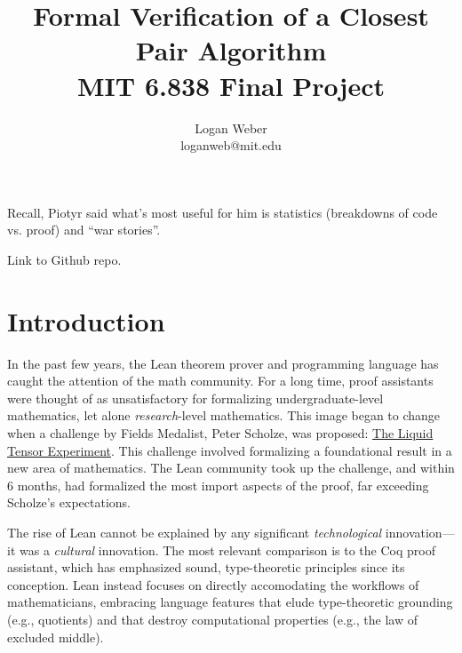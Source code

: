 \documentclass{article}
\begin{document}
\title{%
  Formal Verification of a Closest Pair Algorithm
  \\[0.5em]
  \large MIT 6.838 Final Project \\
}

\author{
Logan Weber\\
loganweb@mit.edu
}

\def\aSigma{\overline{\Sigma}}
\def\asigma{\overline{\sigma}}
\def\aheap{\overline{h}}

\date{}

\maketitle

\tableofcontents

Recall, Piotyr said what's most useful for him is statistics (breakdowns of code vs. proof) and ``war stories''.

Link to Github repo.

\section{Introduction}
In the past few years, the Lean theorem prover and programming language has caught the attention of the math community.
For a long time, proof assistants were thought of as unsatisfactory for formalizing undergraduate-level mathematics, let alone \textit{research}-level mathematics.
This image began to change when a challenge by Fields Medalist, Peter Scholze, was proposed: \href{https://xenaproject.wordpress.com/2020/12/05/liquid-tensor-experiment/}{The Liquid Tensor Experiment}.
This challenge involved formalizing a foundational result in a new area of mathematics.
The Lean community took up the challenge, and within 6 months, had formalized the most import aspects of the proof, far exceeding Scholze's expectations.

The rise of Lean cannot be explained by any significant \textit{technological} innovation---it was a \textit{cultural} innovation.
The most relevant comparison is to the Coq proof assistant, which has emphasized sound, type-theoretic principles since its conception.
Lean instead focuses on directly accomodating the workflows of mathematicians, embracing language features that elude type-theoretic grounding (e.g., quotients) and that destroy computational properties (e.g., the law of excluded middle).
\end{document}
